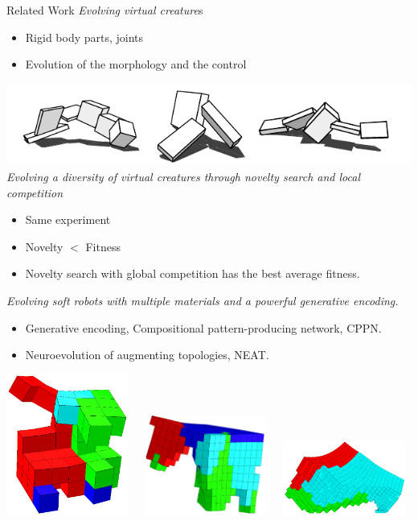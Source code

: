 \documentclass{beamer}
\begin{document}
\begin{frame}[allowframebreaks]{Related Work}
\textit{Evolving virtual creature}s~\cite{sims1994evolving}
\begin{itemize}
\item Rigid body parts, joints
\item Evolution of the morphology and the control
\end{itemize}
\includegraphics[scale=0.5]{figures/evolvingVirtualCreatures.png}\\
\textit{Evolving a diversity of virtual creatures through novelty search and local competition} ~\cite{lehman2011evolving}
\begin{itemize}
\item Same experiment
\item Novelty $<$ Fitness
\item Novelty search with global competition has the best average fitness.
\end{itemize}
\newpage
\textit{Evolving soft robots with multiple materials and a powerful generative encoding.}~\cite{cheney2013unshackling}
\begin{itemize}
\item Generative encoding, Compositional pattern-producing network, CPPN.
\item Neuroevolution of augmenting topologies, NEAT.
\end{itemize}
\vspace{0.3cm}
\includegraphics[width=0.3\textwidth,height=0.25\textheight]{figures/unshacklingEvolutionFigure1.png}\	\	\	
\includegraphics[width=0.3\textwidth,height=0.25\textheight]{figures/unshacklingEvolutionFigure2.png}\	\	\	
\includegraphics[width=0.3\textwidth,height=0.25\textheight]{figures/unshacklingEvolutionFigure3.png}
\end{frame}
\end{document}
